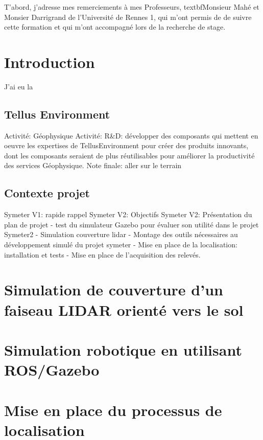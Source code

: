 \documentclass[12pt,a4paper]{report}
\begin{document}
T'abord, j'adresse mes remerciements à mes Professeurs, textbf{Monsieur Mahé et Monsier Darrigrand de l'Université de Rennes 1}, qui m'ont permis de de suivre cette formation et qui m'ont accompagné lors de la recherche de stage.

\chapter{Introduction}

J'ai eu la 

\section{Tellus Environment}
Activité: Géophysique
Activité: R\&D: développer des composants qui mettent en oeuvre les expertises de TellusEnvironment pour créer des produits innovants, dont les composants seraient de plus réutilisables pour améliorer la productivité des services Géophysique.
Note finale: aller sur le terrain

\section{Contexte projet}
Symeter V1: rapide rappel
Symeter V2: Objectifs
Symeter V2: Présentation du plan de projet
- test du simulateur Gazebo pour évaluer son utilité dans le projet Symeter2
- Simulation couverture lidar
- Montage des outils nécessaires au développement simulé du projet symeter
- Mise en place de la localisation: installation et tests
- Mise en place de l'acquisition des relevés.


\chapter{Simulation de couverture d'un faiseau LIDAR orienté vers le sol}

\chapter{Simulation robotique en utilisant ROS/Gazebo}
\section{}

\chapter{Mise en place du processus de localisation}
\end{document}
